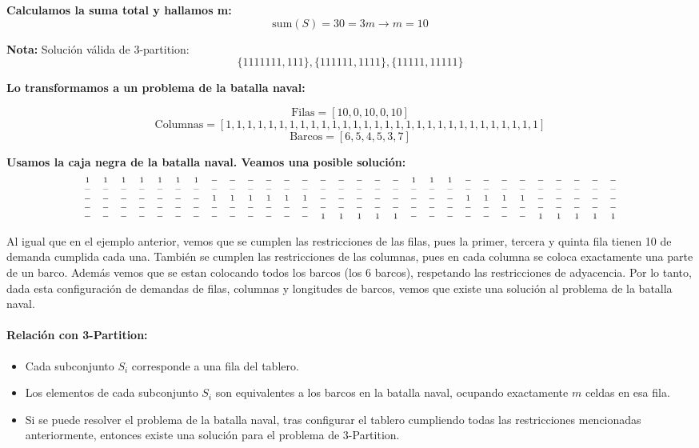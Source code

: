 \textbf{Calculamos la suma total y hallamos m:}
\[
\text{sum}(S) = 30 = 3m \rightarrow m = 10
\]

\textbf{Nota:} Solución válida de 3-partition:
\[
    \{1111111, 111\}, \{111111, 1111\}, \{11111, 11111\}
\]

\textbf{Lo transformamos a un problema de la batalla naval:}

\[
\text{Filas} = [10, 0, 10, 0, 10]
\]
\[
\text{Columnas} = [1, 1, 1, 1, 1, 1, 1, 1, 1, 1, 1, 1, 1, 1, 1, 1, 1, 1, 1, 1, 1, 1, 1, 1, 1, 1, 1, 1, 1, 1]
\]
\[
\text{Barcos} = [6, 5, 4, 5, 3, 7]
\]

\textbf{Usamos la caja negra de la batalla naval. Veamos una posible solución:}
\[
\scriptsize
\begin{array}{cccccccccccccccccccccccccccccc}
1 & 1 & 1 & 1 & 1 & 1 & 1 & - & - & - & - & - & - & - & - & - & - & - & 1 & 1 & 1 & - & - & - & - & - & - & - & - & - \\
- & - & - & - & - & - & - & - & - & - & - & - & - & - & - & - & - & - & - & - & - & - & - & - & - & - & - & - & - & - \\
- & - & - & - & - & - & - & 1 & 1 & 1 & 1 & 1 & 1 & - & - & - & - & - & - & - & - & 1 & 1 & 1 & 1 & - & - & - & - & - \\
- & - & - & - & - & - & - & - & - & - & - & - & - & - & - & - & - & - & - & - & - & - & - & - & - & - & - & - & - & - \\
- & - & - & - & - & - & - & - & - & - & - & - & - & 1 & 1 & 1 & 1 & 1 & - & - & - & - & - & - & - & 1 & 1 & 1 & 1 & 1 \\
\end{array}
\]

Al igual que en el ejemplo anterior, vemos que se cumplen las restricciones de las filas, pues la primer, tercera y quinta fila tienen 10 de demanda cumplida cada una.
También se cumplen las restricciones de las columnas, pues en cada columna se coloca exactamente una parte de un barco.
Además vemos que se estan colocando todos los barcos (los 6 barcos), respetando las restricciones de adyacencia.
Por lo tanto, dada esta configuración de demandas de filas, columnas y longitudes de barcos, vemos que existe una solución al problema de la batalla naval.

\paragraph{Relación con 3-Partition:}
\begin{itemize}
    \item Cada subconjunto \(S_i\) corresponde a una fila del tablero. 
    \item Los elementos de cada subconjunto \(S_i\) son equivalentes a los barcos en la batalla naval, ocupando exactamente \(m\) celdas en esa fila.
    \item Si se puede resolver el problema de la batalla naval, tras configurar el tablero cumpliendo todas las restricciones mencionadas anteriormente, entonces existe una solución para el problema de \(3\)-Partition.
\end{itemize}

